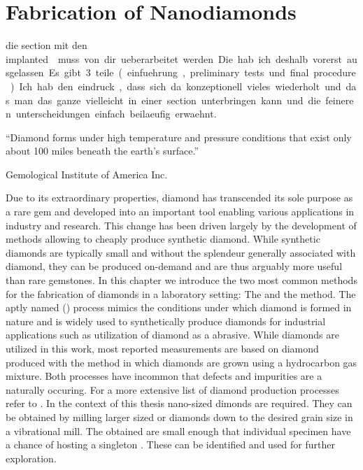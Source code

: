 
\chapter{Fabrication of Nanodiamonds}	\label{ch::fabrication_nanodiamonds}

	\begin{remark}
			\item die section mit den \si implanted \nds muss von dir ueberarbeitet werden. Die hab ich deshalb vorerst ausgelassen. Es gibt 3 teile (einfuehrung, preliminary tests und final procedure). Ich hab den eindruck, dass sich da konzeptionell vieles wiederholt und das man das ganze vielleicht in einer section unterbringen kann und die feineren unterscheidungen einfach beilaeufig erwaehnt.
	\end{remark}

	\epigraph{``Diamond forms under high temperature and pressure conditions that exist only about 100 miles beneath the earth's surface.''}{\textup{Gemological Institute of America Inc.}}

	Due to its extraordinary properties, diamond has transcended its sole purpose as a rare gem and developed into an important tool enabling various applications in industry and research. This change has been driven largely by the development of methods allowing to cheaply produce synthetic diamond. While synthetic diamonds are typically small and without the splendeur generally associated with diamond, they can be produced on-demand and are thus arguably more useful than rare gemstones.
	In this chapter we introduce the two most common methods for the fabrication of diamonds in a laboratory setting: The \hpht and the \cvd method.
	The aptly named \hpht (\HPHT) process mimics the conditions under which diamond is formed in nature and is widely used to synthetically produce diamonds for industrial applications such as utilization of diamond as a abrasive.
	While \HPHT diamonds are utilized in this work, most reported measurements are based on diamond produced with the \CVD method in which diamonds are grown using a hydrocarbon gas mixture. Both processes have incommon that defects and impurities are a naturally occuring.
	For a more extensive list of diamond production processes refer to \cite{davis1993diamond}.
	In the context of this thesis nano-sized dimonds are required. They can be obtained by milling larger sized \HPHT or \CVD diamonds down to the desired grain size in a vibrational mill.
	The obtained \nds are small enough that individual specimen have a chance of hosting a singleton \siv. These can be identified and used for further exploration.

